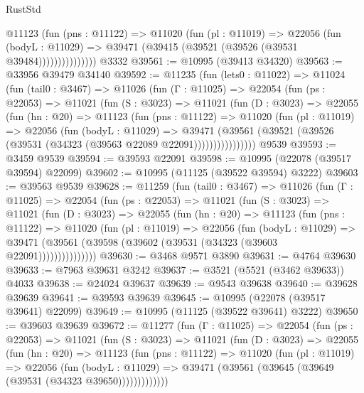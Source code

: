 \begin{lexlean}{RustStd}
\begin{coremodule}
                  @11123
                    (fun (pns : @11122) =>
                    @11020
                      (fun (pl : @11019) =>
                      @22056
                        (fun (bodyL : @11029) =>
                        @39471 (@39415 (@39521 (@39526 (@39531 @39484)))))))))))))))
    @3332
@39561 := @10995 (@39413 @34320)
@39563 := @33956 @39479 @34140
@39592 := @11235
    (fun (lets0 : @11022) =>
    @11024
      (fun (tail0 : @3467) =>
      @11026
        (fun (Γ : @11025) =>
        @22054
          (fun (ps : @22053) =>
          @11021
            (fun (S : @3023) =>
            @11021
              (fun (D : @3023) =>
              @22055
                (fun (hn : @20) =>
                @11123
                  (fun (pns : @11122) =>
                  @11020
                    (fun (pl : @11019) =>
                    @22056
                      (fun (bodyL : @11029) =>
                      @39471
                        (@39561
                          (@39521 (@39526 (@39531 (@34323 (@39563 @22089 @22091))))))))))))))))
    @9539
@39593 := @3459 @9539
@39594 := @39593 @22091
@39598 := @10995 (@22078 (@39517 @39594) @22099)
@39602 := @10995 (@11125 (@39522 @39594) @3222)
@39603 := @39563 @9539
@39628 := @11259
    (fun (tail0 : @3467) =>
    @11026
      (fun (Γ : @11025) =>
      @22054
        (fun (ps : @22053) =>
        @11021
          (fun (S : @3023) =>
          @11021
            (fun (D : @3023) =>
            @22055
              (fun (hn : @20) =>
              @11123
                (fun (pns : @11122) =>
                @11020
                  (fun (pl : @11019) =>
                  @22056
                    (fun (bodyL : @11029) =>
                    @39471 (@39561 (@39598 (@39602 (@39531 (@34323 (@39603 @22091)))))))))))))))
@39630 := @3468 @9571 @3890
@39631 := @4764 @39630
@39633 := @7963 @39631 @3242
@39637 := @3521 (@5521 (@3462 @39633)) @4033
@39638 := @24024 @39637
@39639 := @9543 @39638
@39640 := @39628 @39639
@39641 := @39593 @39639
@39645 := @10995 (@22078 (@39517 @39641) @22099)
@39649 := @10995 (@11125 (@39522 @39641) @3222)
@39650 := @39603 @39639
@39672 := @11277
    (fun (Γ : @11025) =>
    @22054
      (fun (ps : @22053) =>
      @11021
        (fun (S : @3023) =>
        @11021
          (fun (D : @3023) =>
          @22055
            (fun (hn : @20) =>
            @11123
              (fun (pns : @11122) =>
              @11020
                (fun (pl : @11019) =>
                @22056
                  (fun (bodyL : @11029) =>
                  @39471 (@39561 (@39645 (@39649 (@39531 (@34323 @39650)))))))))))))

\end{coremodule}
\end{lexlean}

